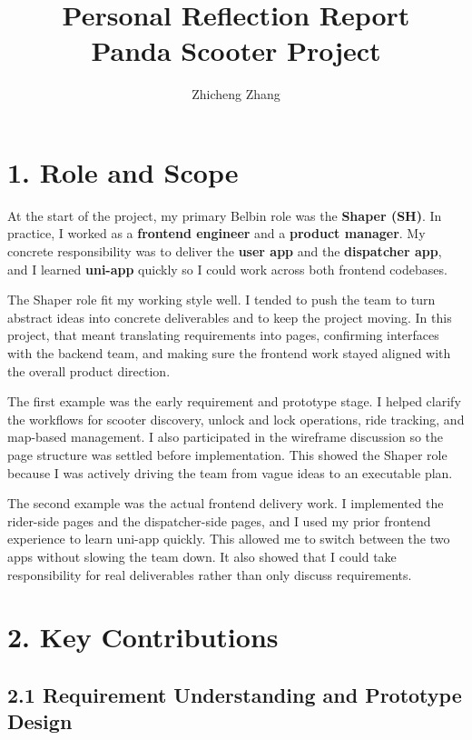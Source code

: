 \documentclass[12pt,a4paper]{article}
\title{\textbf{Personal Reflection Report}\\Panda Scooter Project}
\author{Zhicheng Zhang}
\date{}
\begin{document}
\maketitle

\section*{1. Role and Scope}

At the start of the project, my primary Belbin role was the \textbf{Shaper (SH)}. In practice, I worked as a \textbf{frontend engineer} and a \textbf{product manager}. My concrete responsibility was to deliver the \textbf{user app} and the \textbf{dispatcher app}, and I learned \textbf{uni-app} quickly so I could work across both frontend codebases.

The Shaper role fit my working style well. I tended to push the team to turn abstract ideas into concrete deliverables and to keep the project moving. In this project, that meant translating requirements into pages, confirming interfaces with the backend team, and making sure the frontend work stayed aligned with the overall product direction.

The first example was the early requirement and prototype stage. I helped clarify the workflows for scooter discovery, unlock and lock operations, ride tracking, and map-based management. I also participated in the wireframe discussion so the page structure was settled before implementation. This showed the Shaper role because I was actively driving the team from vague ideas to an executable plan.

The second example was the actual frontend delivery work. I implemented the rider-side pages and the dispatcher-side pages, and I used my prior frontend experience to learn uni-app quickly. This allowed me to switch between the two apps without slowing the team down. It also showed that I could take responsibility for real deliverables rather than only discuss requirements.



\section*{2. Key Contributions}

\subsection*{2.1 Requirement Understanding and Prototype Design}
\end{document}

